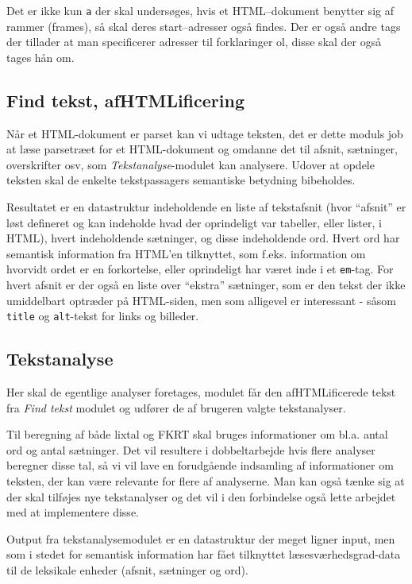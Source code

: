 \documentclass[a4paper,oneside,article, titlepage]{article}
\begin{document}
Det er ikke kun \texttt{a} der skal undersøges, hvis et HTML--dokument
benytter sig af rammer (frames), så skal deres start--adresser også
findes. Der er også andre tags der tillader at man specificerer
adresser til forklaringer ol, disse skal der også tages hån om.

\subsection{Find tekst, afHTMLificering}
Når et HTML-dokument er parset kan vi udtage teksten, det er dette
moduls job at læse parsetræet for et HTML-dokument og omdanne det til
afsnit, sætninger, overskrifter osv, som \textit{Tekstanalyse}-modulet
kan analysere. Udover at opdele teksten skal de enkelte tekstpassagers
semantiske betydning bibeholdes.

Resultatet er en datastruktur indeholdende en liste af tekstafsnit
(hvor ``afsnit'' er løst defineret og kan indeholde hvad der
oprindeligt var tabeller, eller lister, i HTML), hvert indeholdende
sætninger, og disse indeholdende ord. Hvert ord har semantisk
information fra HTML'en tilknyttet, som f.eks. information om hvorvidt
ordet er en forkortelse, eller oprindeligt har været inde i et
\texttt{em}-tag. For hvert afsnit er der også en liste over ``ekstra''
sætninger, som er den tekst der ikke umiddelbart optræder på
HTML-siden, men som alligevel er interessant - såsom \texttt{title} og
\texttt{alt}-tekst for links og billeder.

\subsection{Tekstanalyse}
Her skal de egentlige analyser foretages, modulet får den
afHTMLificerede tekst fra \textit{Find tekst} modulet og udfører de
af brugeren valgte tekstanalyser.

Til beregning af både lixtal og FKRT skal bruges informationer om
bl.a. antal ord og antal sætninger. Det vil resultere i dobbeltarbejde
hvis flere analyser beregner disse tal, så vi vil lave en forudgående
indsamling af informationer om teksten, der kan være relevante for
flere af analyserne. Man kan også tænke sig at der skal tilføjes nye
tekstanalyser og det vil i den forbindelse også lette arbejdet med at
implementere disse.

Output fra tekstanalysemodulet er en datastruktur der meget ligner
input, men som i stedet for semantisk information har fået tilknyttet
læsesværhedsgrad-data til de leksikale enheder (afsnit, sætninger og
ord).
\end{document}
